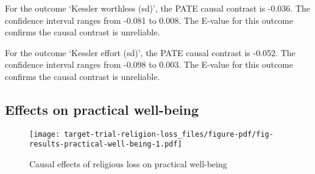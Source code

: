 \documentclass[
  singlecolumn]{report}
\begin{document}
For the outcome `Kessler worthless (sd)', the PATE causal contrast is
-0.036. The confidence interval ranges from -0.081 to 0.008. The E-value
for this outcome confirms the causal contrast is unreliable.

For the outcome `Kessler effort (sd)', the PATE causal contrast is
-0.052. The confidence interval ranges from -0.098 to 0.003. The E-value
for this outcome confirms the causal contrast is unreliable.

\hypertarget{effects-on-practical-well-being}{%
\subsection{Effects on practical
well-being}\label{effects-on-practical-well-being}}

\begin{figure}

{\centering \texttt{[image: target-trial-religion-loss\_files/figure-pdf/fig-results-practical-well-being-1.pdf]}

}

\caption{\label{fig-results-practical-well-being}Causal effects of
religious loss on practical well-being}

\end{figure}
\end{document}
